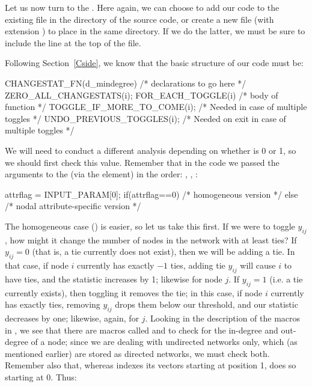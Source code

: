 \documentclass[nojss]{jss}
\begin{document}
Let us now turn to the . Here again, we can choose to add our code to the existing file  in the  directory of the  source code, or create a new file (with extension ) to place in the same directory. If we do the latter, we must be sure to include the line  at the top of the file.

Following Section~\ref{Cside}, we know that the basic structure of our  code must be:

\begin{CodeChunk}
\begin{CodeInput}
CHANGESTAT_FN(d_mindegree) {
  /* declarations to go here */
  ZERO_ALL_CHANGESTATS(i);
  FOR_EACH_TOGGLE(i) {
    /* body of function */
    TOGGLE_IF_MORE_TO_COME(i); /* Needed in case of multiple toggles */
  }
  UNDO_PREVIOUS_TOGGLES(i); /* Needed on exit in case of multiple toggles */
}
\end{CodeInput}
\end{CodeChunk}

We will need to conduct a different analysis depending on whether  is 0 or 1, so we should first check this value.  Remember that in the  code we passed the arguments to the  (via the  element) in the order: , , :

\begin{CodeChunk}
\begin{CodeInput}
  attrflag = INPUT_PARAM[0];
  if(attrflag==0){
    /* homogeneous version */
  }else{
    /* nodal attribute-specific version */
  }
\end{CodeInput}
\end{CodeChunk}

The homogeneous case () is easier, so let us take this first.  If we were to toggle $y_{ij}$, how might it change the number of nodes in the network with at least  ties?  If $y_{ij}=0$ (that is, a tie currently does not exist), then we will be adding a tie. In that case, if node $i$ currently has exactly $-1$ ties, adding tie $y_{ij}$ will cause $i$ to have  ties, and the statistic increases by 1; likewise for node $j$.  If $y_{ij}=1$ (i.e. a tie currently exists), then toggling it removes the tie; in this case, if node $i$ currently has exactly  ties, removing $y_{ij}$ drops them below our threshold, and our statistic decreases by one; likewise, again, for $j$. Looking in the description of the macros in , we see that there are macros called  and  to check for the in-degree and out-degree of a node; since we are dealing with undirected networks only, which (as mentioned earlier) are stored as directed networks, we must check both. Remember also that, whereas  indexes its vectors starting at position 1,  does so starting at 0. Thus:
\end{document}
